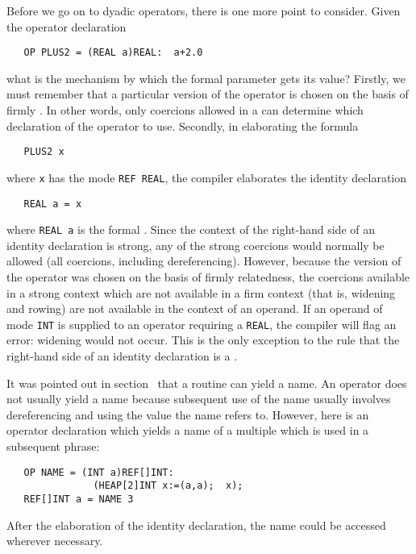 Before we go on to dyadic operators, there is one more point to
consider. Given the operator declaration
\begin{verbatim}
   OP PLUS2 = (REAL a)REAL:  a+2.0
\end{verbatim}
\noindent
what is the mechanism by which the formal parameter gets its value?
Firstly, we must remember that a particular version of the operator is
chosen on the basis of firmly . In
other words, only coercions allowed in a
 can determine which declaration
of the operator to use.  Secondly, in elaborating the formula
\begin{verbatim}
   PLUS2 x
\end{verbatim}
\noindent
where \verb|x| has the mode \verb|REF REAL|, the compiler elaborates
the identity declaration
\begin{verbatim}
   REAL a = x
\end{verbatim}
\noindent
where \verb|REAL a| is the formal .
Since the context of the right-hand side of an identity declaration
is strong, any of the strong coercions would normally be allowed (all
coercions, including dereferencing).  However, because the version of
the operator was chosen on the basis of firmly relatedness, the
coercions available in a strong context which are not available in a
firm context (that is, widening and rowing) are not available in the
context of an operand.  If an operand of mode \verb|INT| is supplied
to an operator requiring a \verb|REAL|, the compiler will flag an
error: widening would not occur. This is the only exception to the
rule that the right-hand side of an identity declaration is a
.

It was pointed out in section~ that a routine can
yield a name.  An operator does not usually yield a name because
subsequent use of the name usually involves dereferencing and using
the value the name refers to.  However, here is an operator
declaration which yields a name of a multiple which is used in a
subsequent phrase:
\begin{verbatim}
   OP NAME = (INT a)REF[]INT:
               (HEAP[2]INT x:=(a,a);  x);
   REF[]INT a = NAME 3
\end{verbatim}
\noindent
After the elaboration of the identity declaration, the name could be
accessed wherever necessary.

